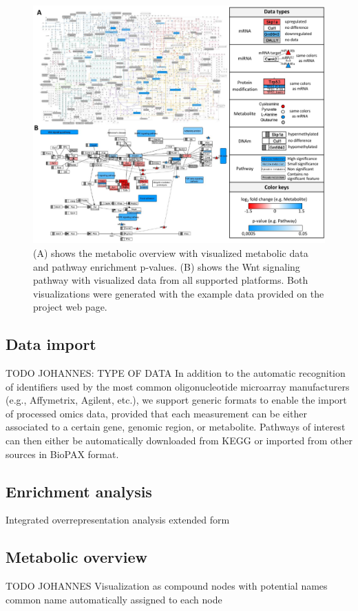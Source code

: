 \documentclass[final,5p,times,twocolumn]{elsarticle}
\begin{document}
\begin{figure}[t]
\center
\includegraphics[width=1.0\textwidth]{InCroMAP_examples.pdf}
\caption{(A) shows the metabolic overview with visualized metabolic data and pathway enrichment p-values. (B) shows the Wnt signaling pathway with visualized data from all supported platforms. Both visualizations were generated with the example data provided on the project web page.}
\label{fig:incromap-examples}
\end{figure}

\subsection{Data import}
TODO JOHANNES: TYPE OF DATA
In addition to the automatic recognition of identifiers used by the most common oligonucleotide microarray manufacturers (e.g., Affymetrix, Agilent, etc.), we support generic formats to enable the import of processed omics data, provided that each measurement can be either associated to a certain gene, genomic region, or metabolite. Pathways of interest can then either be automatically downloaded from KEGG or imported from other sources in BioPAX format. 

\subsection{Enrichment analysis}
Integrated overrepresentation analysis extended form \cite{Backes2007}


\subsection{Metabolic overview}
TODO JOHANNES
Visualization as compound nodes with potential names
common name automatically assigned to each node
\end{document}
